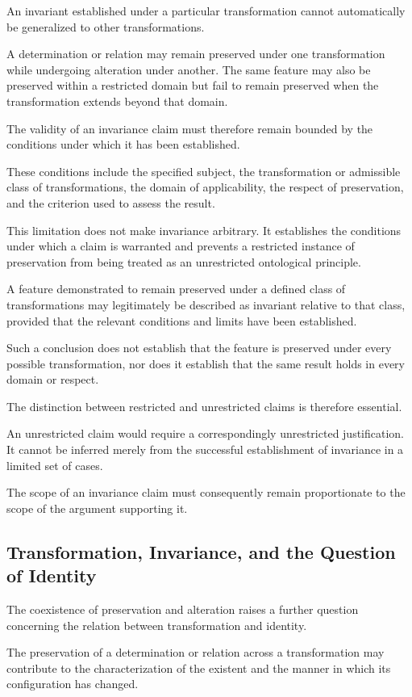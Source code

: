 An invariant established under a particular
transformation cannot automatically be generalized
to other transformations.

A determination or relation may remain preserved
under one transformation while undergoing alteration
under another. The same feature may also be preserved
within a restricted domain but fail to remain
preserved when the transformation extends beyond
that domain.

The validity of an invariance claim must therefore
remain bounded by the conditions under which it
has been established.

These conditions include the specified subject,
the transformation or admissible class of transformations,
the domain of applicability, the respect of preservation,
and the criterion used to assess the result.

This limitation does not make invariance arbitrary.
It establishes the conditions under which a claim
is warranted and prevents a restricted instance
of preservation from being treated as an unrestricted
ontological principle.

A feature demonstrated to remain preserved under
a defined class of transformations may legitimately
be described as invariant relative to that class,
provided that the relevant conditions and limits
have been established.

Such a conclusion does not establish that the
feature is preserved under every possible
transformation, nor does it establish that the
same result holds in every domain or respect.

The distinction between restricted and unrestricted
claims is therefore essential.

An unrestricted claim would require a correspondingly
unrestricted justification. It cannot be inferred
merely from the successful establishment of invariance
in a limited set of cases.

The scope of an invariance claim must consequently
remain proportionate to the scope of the argument
supporting it.

\subsection{Transformation, Invariance, and the Question of Identity}

The coexistence of preservation and alteration
raises a further question concerning the relation
between transformation and identity.

The preservation of a determination or relation
across a transformation may contribute to the
characterization of the existent and the manner
in which its configuration has changed.

